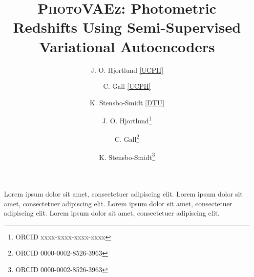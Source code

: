 \documentclass[bibyear]{aa}
\begin{document}
\title{\textsc{PhotoVAEz}: Photometric Redshifts Using Semi-Supervised Variational Autoencoders}

\author{
J. O. Hjortlund \ref{UCPH}
\and
C. Gall \ref{UCPH}
\and
K. Stensbo-Smidt \ref{DTU}
}

\author{
      J. O. Hjortlund\fnmsep\thanks{ORCID xxxx-xxxx-xxxx-xxxx}
      \and C. Gall\thanks{ORCID 0000-0002-8526-3963}
      \and K. Stensbo-Smidt\fnmsep\thanks{ORCID 0000-0002-8526-3963}
      }

 {Lorem ipsum dolor sit amet, consectetuer adipiscing elit.} {Lorem ipsum dolor sit amet, consectetuer adipiscing elit.} {Lorem ipsum dolor sit amet, consectetuer adipiscing elit.} {Lorem ipsum dolor sit amet, consectetuer adipiscing elit.}

\maketitle








\end{document}
